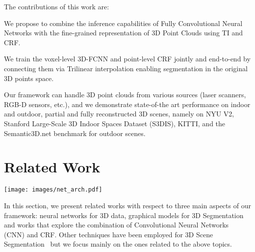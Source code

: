 \documentclass[10pt,twocolumn,letterpaper]{article}
\newcommand{\threedfcnn}[0]{3D-FCNN\xspace}
\newenvironment{tight_itemize}{
\begin{itemize}[leftmargin=10pt]
  \setlength{\topsep}{0pt}
  \setlength{\itemsep}{2pt}
  \setlength{\parskip}{0pt}
  \setlength{\parsep}{0pt}
}{\end{itemize}}
\begin{document}
The contributions of this work are:
\begin{tight_itemize}
    \item{We propose to combine the inference capabilities of Fully Convolutional Neural Networks with  the fine-grained representation of 3D Point Clouds using TI and CRF.}
    \item{We train the voxel-level \threedfcnn and point-level CRF jointly and end-to-end by connecting them via Trilinear interpolation enabling segmentation in the original 3D points space.}
\end{tight_itemize}

Our framework can handle 3D point clouds from various sources (laser scanners, RGB-D sensors,  etc.), and we demonstrate state-of-the art performance on indoor and outdoor, partial and fully reconstructed 3D scenes, namely on NYU V2\cite{Silberman:ECCV12}, Stanford Large-Scale 3D Indoor Spaces Dataset (S3DIS)\cite{Armeni2016}, KITTI\cite{Geiger2013IJRR,Geiger:2012:WRA:2354409.2354978}, and the Semantic3D.net benchmark for outdoor scenes\cite{l3d}. 
\section{Related Work}
\begin{figure*}[t]
\centering
\vspace{-10mm}

\texttt{[image: images/net\_arch.pdf]}

\caption{\small{\textbf{Network architecture}: The \threedfcnn is made of 3 residual layers sandwiched between 2 convolutional layers. Max Pooling in the early stages of the network yields a 4X downsampling.}}
\label{fig:network_architecture}
\vspace{-5mm}
\end{figure*}

In this section, we present related works with respect to three main aspects of our framework: neural networks for 3D data, graphical models for 3D Segmentation and works that explore the combination of Convolutional Neural Networks (CNN) and CRF. Other techniques have been employed for 3D Scene Segmentation~\cite{Cohen, Aijazi, Lalonde_2006_5611} but we focus mainly on the ones related to the above topics.
\end{document}
